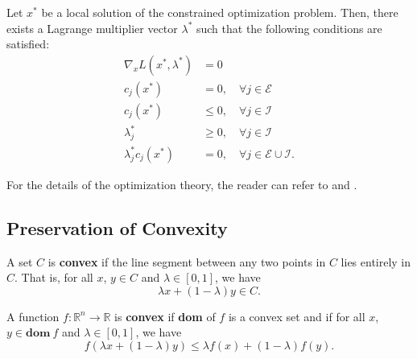 \begin{theorem}
  Let $x^*$ be a local solution of the constrained optimization problem. 
  Then, there exists a Lagrange multiplier vector $\lambda^*$ such that the following conditions are satisfied:
  \begin{equation}
    \begin{aligned}
      \nabla_x L(x^*,\lambda^*) &= 0\\
      c_j(x^*) &= 0, \quad \forall j\in\mathcal E\\
      c_j(x^*) &\leq 0, \quad \forall j\in\mathcal I\\
      \lambda_j^* &\geq 0, \quad \forall j\in\mathcal I\\
      \lambda_j^*c_j(x^*) &= 0, \quad \forall j\in\mathcal E\cup\mathcal I
      .
    \end{aligned}
  \end{equation}
  \label{chap2:thm:KKT}
\end{theorem}
For the details of the optimization theory, the reader can refer to \cite{RN9} and \cite{RN1}.

\subsection{Preservation of Convexity} \label{chap2:sec:convex_preserve}

\begin{definition}
  A set $C$ is \textbf{convex} if the line segment between any two points in $C$ lies entirely in $C$. That is, for all $x$, $y\in C$ and $\lambda\in [0,1]$, we have
  \begin{equation}
      \lambda x + (1-\lambda)y \in C
      .
  \end{equation}
\end{definition}

\begin{definition}
  A function $f:\mathbb R^n\to \mathbb R$ is \textbf{convex} if \textbf{dom} of $f$ is a convex set and if for all $x$, $y\in \textbf{dom}\ f$ and $\lambda\in [0,1]$, we have
  \begin{equation}
      f(\lambda x + (1-\lambda)y) \leq \lambda f(x) + (1-\lambda)f(y)
      .
  \end{equation}
\end{definition}

